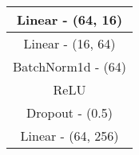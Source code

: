 \begin{table}[h!]
\begin{minipage}[t]{0.24\textwidth}
\begin{tabular}{|clllll|}
        \multicolumn{6}{c}{Linear - (64, 16)}                        \\ \hline
        \multicolumn{6}{c}{Linear - (16, 64)}                        \\ \hline
        \multicolumn{6}{c}{BatchNorm1d - (64)}                   \\ \hline
        \multicolumn{6}{c}{ReLU}                          \\ \hline
        \multicolumn{6}{c}{Dropout - (0.5) }                       \\ \hline
        \multicolumn{6}{c}{Linear - (64, 256)}                        \\ \hline
        \end{tabular}
    \end{minipage}
\end{table}



